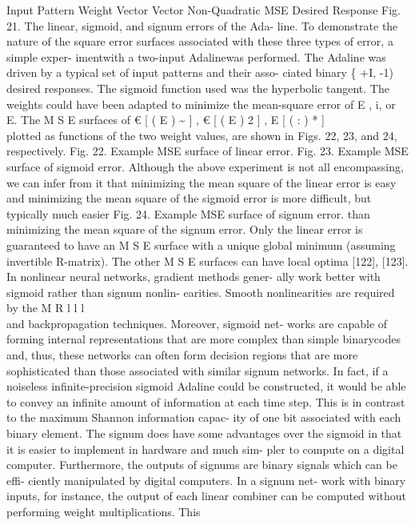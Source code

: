 Input Pattern Weight Vector Vector Non-Quadratic MSE Desired Response
Fig. 21. The linear, sigmoid, and signum errors of the Ada- line. To
demonstrate the nature of the square error surfaces associated with
these three types of error, a simple exper- imentwith a two-input
Adalinewas performed. The Adaline was driven by a typical set of input
patterns and their asso- ciated binary \{ +I, -1) desired responses. The
sigmoid function used was the hyperbolic tangent. The weights could have
been adapted to minimize the mean-square error of E , i, or E. The M S E
surfaces of € {[} ( E ) \textasciitilde{} {]} , € {[} ( E ) 2 {]} , E
{[} ( : ) * {]}\\
plotted as functions of the two weight values, are shown in Figs. 22,
23, and 24, respectively. Fig. 22. Example MSE surface of linear error.
Fig. 23. Example MSE surface of sigmoid error. Although the above
experiment is not all encompassing, we can infer from it that minimizing
the mean square of the linear error is easy and minimizing the mean
square of the sigmoid error is more difficult, but typically much easier
Fig. 24. Example MSE surface of signum error. than minimizing the mean
square of the signum error. Only the linear error is guaranteed to have
an M S E surface with a unique global minimum (assuming invertible
R-matrix). The other M S E surfaces can have local optima {[}122{]},
{[}123{]}. In nonlinear neural networks, gradient methods gener- ally
work better with sigmoid rather than signum nonlin- earities. Smooth
nonlinearities are required by the M R l l l\\
and backpropagation techniques. Moreover, sigmoid net- works are capable
of forming internal representations that are more complex than simple
binarycodes and, thus, these networks can often form decision regions
that are more sophisticated than those associated with similar signum
networks. In fact, if a noiseless infinite-precision sigmoid Adaline
could be constructed, it would be able to convey an infinite amount of
information at each time step. This is in contrast to the maximum
Shannon information capac- ity of one bit associated with each binary
element. The signum does have some advantages over the sigmoid in that
it is easier to implement in hardware and much sim- pler to compute on a
digital computer. Furthermore, the outputs of signums are binary signals
which can be effi- ciently manipulated by digital computers. In a signum
net- work with binary inputs, for instance, the output of each linear
combiner can be computed without performing weight multiplications. This
